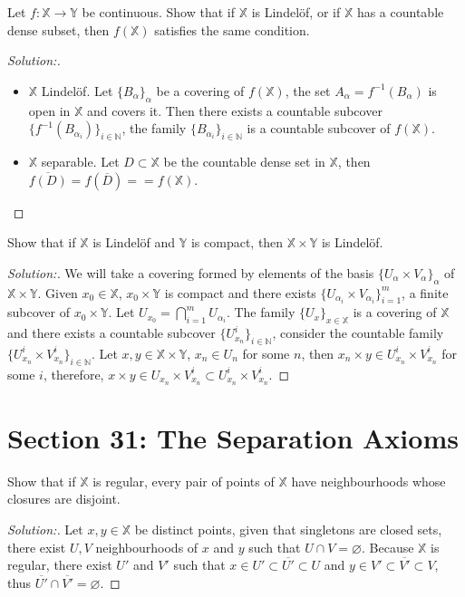 \documentclass[a4paper,12pt, reqno]{article}
\theoremstyle{definition}
\newenvironment{exerr}[1]{
  \renewcommand\theexeralt{#1}
  \exeralt
}{\endexeralt}
\newenvironment{solution}{\begin{proof}[Solution:]}{\end{proof}}
\newcommand{\N}{\mathbb{N}}
\newcommand{\X}{\mathbb{X}}
\newcommand{\Y}{\mathbb{Y}}
\begin{document}
\begin{exerr}{11}
  Let $f:\X\to\Y$ be continuous. Show that if $\X$ is Lindelöf, or if $\X$ has a countable dense subset, then $f(\X)$ satisfies the same condition.
\end{exerr}
\begin{solution}\hfill
  \begin{itemize}
    \item $\X$ Lindelöf. Let $\{ B_{\alpha} \}_{\alpha}$ be a covering of $f(\X)$, the set $A_{\alpha} = f^{-1}(B_{\alpha})$ is open in $\X$ and covers it. Then there exists a countable subcover $\{ f^{-1}(B_{\alpha_{i}}) \}_{i\in\N}$, the family $\{ B_{\alpha_{i}} \}_{i\in\N}$ is a countable subcover of $f(\X)$.
    \item $\X$ separable. Let $D\subset\X$ be the countable dense set in $\X$, then $\overline{f(D)} = f(\overline{D}) = = f(\X)$.
  \end{itemize}
\end{solution}

\begin{exerr}{14}
  Show that if $\X$ is Lindelöf and $\Y$ is compact, then $\X\times\Y$ is Lindelöf.
\end{exerr}
\begin{solution}
  We will take a covering formed by elements of the basis $\{ U_{\alpha}\times V_{\alpha} \}_{\alpha}$ of $\X\times\Y$. Given $x_{0}\in\X$, $x_{0}\times\Y$ is compact and there exists $\{ U_{\alpha_{i}}\times V_{\alpha_{i}} \}_{i=1}^m$, a finite subcover of $x_{0}\times\Y$. Let $U_{x_{0}} = \bigcap_{i=1}^m U_{\alpha_{i}}$. The family $\{ U_{x} \}_{x\in\X}$ is a covering of $\X$ and there exists a countable subcover $\{ U_{x_{n}}^i \}_{i\in\N}$, consider the countable family $\{ U_{x_{n}}^i\times V_{x_{n}}^i \}_{i\in\N}$. Let $x,y\in\X\times\Y$, $x_{n}\in U_{n}$ for some $n$, then $x_{n}\times y\in U_{x_{n}}^i\times V_{x_{n}}^i$ for some $i$, therefore, $x\times y\in U_{x_{n}}\times V_{x_{n}}^i\subset U_{x_{n}}^i\times V_{x_{n}}^i.$
\end{solution}

\section*{Section 31: The Separation Axioms}

\begin{exerr}{1}
  Show that if $\X$ is regular, every pair of points of $\X$ have neighbourhoods whose closures are disjoint.
\end{exerr}
\begin{solution}
  Let $x,y\in\X$ be distinct points, given that singletons are closed sets, there exist $U,V$ neighbourhoods of $x$ and $y$ such that $U\cap V = \varnothing$. Because $\X$ is regular, there exist $U'$ and $V'$ such that $x\in U'\subset \overline{U'}\subset U$ and $y\in V'\subset \overline{V'}\subset V$, thus $\overline{U'}\cap\overline{V'} = \varnothing$.
\end{solution}
\end{document}
